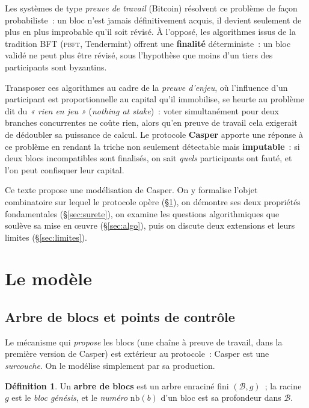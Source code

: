 \documentclass[11pt,a4paper]{article}
\theoremstyle{plain}
\theoremstyle{definition}
\newtheorem{defi}[theoreme]{Définition}
\begin{document}
Les systèmes de type \emph{preuve de travail} (Bitcoin) résolvent ce problème de façon
probabiliste~: un bloc n'est jamais définitivement acquis, il devient seulement de plus en
plus improbable qu'il soit révisé. À l'opposé, les algorithmes issus de la tradition BFT
(\textsc{pbft}, Tendermint) offrent une \textbf{finalité} déterministe~: un bloc validé ne
peut plus être révisé, sous l'hypothèse que moins d'un tiers des participants sont
byzantins.

Transposer ces algorithmes au cadre de la \emph{preuve d'enjeu}, où l'influence d'un
participant est proportionnelle au capital qu'il immobilise, se heurte au problème dit du
\emph{« rien en jeu »} (\emph{nothing at stake})~: voter simultanément pour deux branches
concurrentes ne coûte rien, alors qu'en preuve de travail cela exigerait de dédoubler sa
puissance de calcul. Le protocole \textbf{Casper} apporte une réponse à ce problème en
rendant la triche non seulement détectable mais \textbf{imputable}~: si deux blocs
incompatibles sont finalisés, on sait \emph{quels} participants ont fauté, et l'on peut
confisquer leur capital.

Ce texte propose une modélisation de Casper. On y formalise l'objet combinatoire sur lequel
le protocole opère (§\ref{sec:modele}), on démontre ses deux propriétés fondamentales
(§\ref{sec:surete}), on examine les questions algorithmiques que soulève sa mise en \oe uvre
(§\ref{sec:algo}), puis on discute deux extensions et leurs limites (§\ref{sec:limites}).

\section{Le modèle}\label{sec:modele}

\subsection{Arbre de blocs et points de contrôle}

Le mécanisme qui \emph{propose} les blocs (une chaîne à preuve de travail, dans la première
version de Casper) est extérieur au protocole~: Casper est une \emph{surcouche}. On le
modélise simplement par sa production.

\begin{defi}
Un \textbf{arbre de blocs} est un arbre enraciné fini $(\mathcal{B},g)$~; la racine $g$ est
le \emph{bloc génésis}, et le \emph{numéro} $\mathrm{nb}(b)$ d'un bloc est sa profondeur dans
$\mathcal{B}$.
\end{defi}
\end{document}
